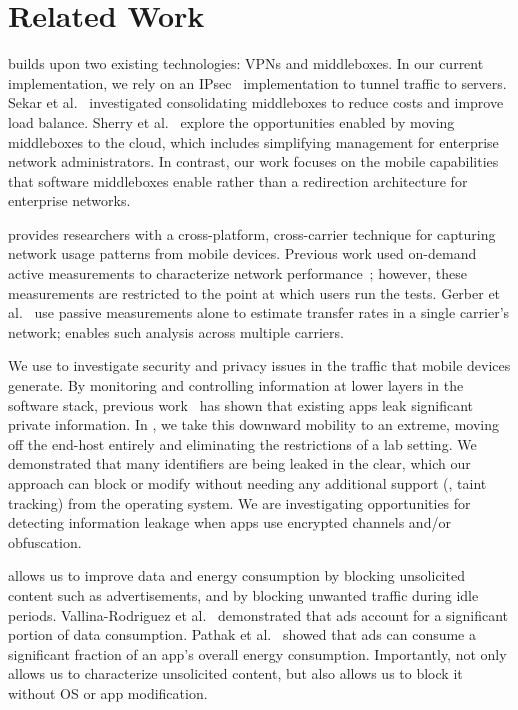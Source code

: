 \section{Related Work}
\meddle builds upon two existing technologies: VPNs and middleboxes. 
In our current implementation, we rely on an IPsec~\cite{rfc:ipsec} implementation 
to tunnel traffic to \meddle servers. Sekar et al.~\cite{sekar:middleboxes} investigated consolidating middleboxes 
to reduce costs and improve load balance. Sherry et al.~\cite{sherry:middleboxes} explore the opportunities 
enabled by moving middleboxes to the cloud, which includes simplifying management 
for enterprise network administrators. In contrast, our work focuses on the mobile capabilities 
that software middleboxes enable rather than a redirection architecture for enterprise networks. 

\meddle provides researchers with a cross-platform, cross-carrier technique 
for capturing network usage patterns from mobile devices. Previous work 
used on-demand active measurements to characterize network performance~\cite{wang:middleboxes,speedtest}; 
however, these measurements are restricted to the point at which users run 
the tests. Gerber et al.~\cite{gerber:passivespeed} use passive measurements alone 
to estimate transfer rates in a single carrier's network; \meddle 
enables such analysis across multiple carriers.

We use \meddle to investigate security and privacy issues in the 
traffic that mobile devices generate. By monitoring and controlling 
information at lower layers in the software stack, previous work~\cite{enck:taintdroid,hornyack:appfence,wsj:apps-watching-you} has shown 
that existing apps leak significant private information. In \meddle, we take 
this downward mobility to an extreme, moving off the end-host entirely and 
eliminating the restrictions of a lab setting. We demonstrated that  
many identifiers are being leaked in the clear, which our approach can 
block or modify without needing any additional support (\eg, taint tracking) 
from the operating system. We are investigating 
opportunities for detecting information leakage when apps use encrypted 
channels and/or obfuscation.

\meddle allows us to improve data and energy consumption by blocking 
unsolicited content such as advertisements, and by blocking unwanted 
traffic during idle periods. Vallina-Rodriguez et al.~\cite{vallina-rod:ads} demonstrated 
that ads account for a significant portion of data consumption. Pathak et al.~\cite{pathak:eprof} 
showed that ads can consume a significant fraction of an app's overall energy consumption. 
Importantly, \meddle not only allows us to characterize unsolicited content, but 
also allows us to block it without OS or app modification.

